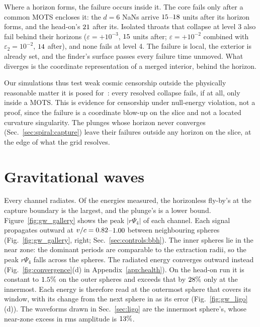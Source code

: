 \documentclass[twocolumn,floatfix,aps,prd,superscriptaddress,nofootinbib,showkeys]{revtex4-2}
\begin{document}
Where a horizon forms, the failure occurs inside it. The core fails only after a common MOTS encloses it: the $d=6$ NaNs arrive $15$--$18$ units after its horizon forms, and the head-on's $21$ after its. Isolated throats that collapse at level 3 also fail behind their horizons ($\varepsilon=+10^{-3}$, $15$ units after; $\varepsilon=+10^{-2}$ combined with $\varepsilon_2=10^{-2}$, $14$ after), and none fails at level 4. The failure is local, the exterior is already set, and the finder's surface passes every failure time unmoved. What diverges is the coordinate representation of a merged interior, behind the horizon.

Our simulations thus test weak cosmic censorship outside the physically reasonable matter it is posed for~\cite{penrose1969,wald1997}: every resolved collapse fails, if at all, only inside a MOTS. This is evidence for censorship under null-energy violation, not a proof, since the failure is a coordinate blow-up on the slice and not a located curvature singularity. The plunges whose horizon never converges (Sec.~\ref{sec:spiral:capture}) leave their failures outside any horizon on the slice, at the edge of what the grid resolves.

\section{Gravitational waves}
\label{sec:gw}

Every channel radiates. Of the energies measured, the horizonless fly-by's at the capture boundary is the largest, and the plunge's is a lower bound. Figure~\ref{fig:gw_gallery} shows the peak $|r\Psi_4|$ of each channel. Each signal propagates outward at $v/c=0.82$--$1.00$ between neighbouring spheres (Fig.~\ref{fig:gw_gallery}, right; Sec.~\ref{sec:controls:bbh}). The inner spheres lie in the near zone: the dominant periods are comparable to the extraction radii, so the peak $r\Psi_4$ falls across the spheres. The radiated energy converges outward instead (Fig.~\ref{fig:convergence}(d) in Appendix~\ref{app:health}). On the head-on run it is constant to $1.5\%$ on the outer spheres and exceeds that by $28\%$ only at the innermost. Each energy is therefore read at the outermost sphere that covers its window, with its change from the next sphere in as its error (Fig.~\ref{fig:gw_ligo}(d)). The waveforms drawn in Sec.~\ref{sec:ligo} are the innermost sphere's, whose near-zone excess in rms amplitude is $13\%$.
\end{document}
